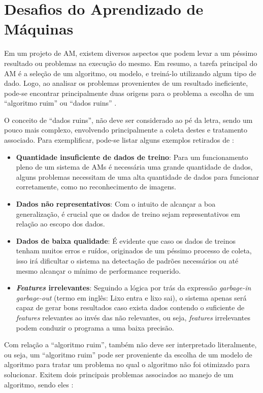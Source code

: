 \section{Desafios do Aprendizado de Máquinas}
Em um projeto de AM, existem diversos aspectos que podem levar a um péssimo resultado ou problemas na execução do mesmo. Em resumo, a tarefa principal do AM é a seleção de um algoritmo, ou modelo, e treiná-lo utilizando algum tipo de dado. Logo, ao analisar os problemas provenientes de um resultado ineficiente, pode-se encontrar principalmente duas origens para o problema a escolha de um “algoritmo ruim” ou “dados ruins” \cite{geron2017hands}.

O conceito de “dados ruins”, não deve ser considerado ao pé da letra, sendo um pouco mais complexo, envolvendo principalmente a coleta destes e tratamento associado. Para exemplificar,  pode-se listar alguns exemplos retirados de :

\begin{itemize}
    \item \textbf{Quantidade insuficiente de dados de treino}: Para um funcionamento pleno de um sistema de AMs é necessária uma grande quantidade de dados, alguns problemas necessitam de uma alta quantidade de dados para funcionar corretamente, como no reconhecimento de imagens.
    \item \textbf{Dados não representativos}: Com o intuito de alcançar a boa generalização, é crucial que os dados de treino sejam representativos em relação ao escopo dos dados.
    \item \textbf{Dados de baixa qualidade}: É evidente que caso os dados de treinos tenham muitos erros e ruídos, originados de um péssimo processo de coleta, isso irá dificultar o sistema na detectação de padrões necessários ou até mesmo alcançar o mínimo de performance requerido.
    \item \textbf{\textit{Features}  irrelevantes}: Seguindo a lógica por trás da expressão \textit{garbage-in garbage-out} (termo em inglês: Lixo entra e lixo sai), o sistema apenas será capaz de gerar bons resultados caso exista dados contendo o suficiente de \textit{features} relevantes ao invés das não relevantes, ou seja, \textit{features} irrelevantes podem conduzir o programa a uma baixa precisão.
\end{itemize}

Com relação a “algoritmo ruim”, também não deve ser interpretado literalmente, ou seja, um “algoritmo ruim” pode ser proveniente da escolha de um modelo de algoritmo para tratar um problema no qual o algoritmo não foi otimizado para solucionar. Exitem dois principais problemas associados ao manejo de um algoritmo, sendo eles \cite{geron2017hands}:

